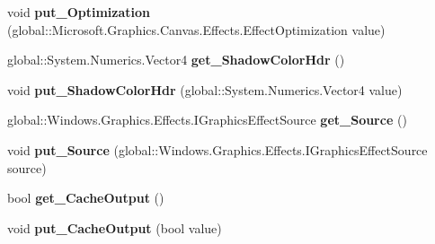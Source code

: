 \begin{DoxyCompactItemize}
void {\bfseries put\+\_\+\+Optimization} (global\+::\+Microsoft.\+Graphics.\+Canvas.\+Effects.\+Effect\+Optimization value)
\item 
\mbox{\label{class_microsoft_1_1_graphics_1_1_canvas_1_1_effects_1_1_shadow_effect_af69aa0225a7b96c1ff39ea116af417b7}} 
global\+::\+System.\+Numerics.\+Vector4 {\bfseries get\+\_\+\+Shadow\+Color\+Hdr} ()
\item 
\mbox{\label{class_microsoft_1_1_graphics_1_1_canvas_1_1_effects_1_1_shadow_effect_a6cbf0da6741b9951835c9e913616a2bc}} 
void {\bfseries put\+\_\+\+Shadow\+Color\+Hdr} (global\+::\+System.\+Numerics.\+Vector4 value)
\item 
\mbox{\label{class_microsoft_1_1_graphics_1_1_canvas_1_1_effects_1_1_shadow_effect_adb562a703cac7d7a98d0a4a852aabc7e}} 
global\+::\+Windows.\+Graphics.\+Effects.\+I\+Graphics\+Effect\+Source {\bfseries get\+\_\+\+Source} ()
\item 
\mbox{\label{class_microsoft_1_1_graphics_1_1_canvas_1_1_effects_1_1_shadow_effect_aa24f56aac89433bb8ba29589ad881cf7}} 
void {\bfseries put\+\_\+\+Source} (global\+::\+Windows.\+Graphics.\+Effects.\+I\+Graphics\+Effect\+Source source)
\item 
\mbox{\label{class_microsoft_1_1_graphics_1_1_canvas_1_1_effects_1_1_shadow_effect_af987e23bb73df6b1f9c785283d094d0d}} 
bool {\bfseries get\+\_\+\+Cache\+Output} ()
\item 
\mbox{\label{class_microsoft_1_1_graphics_1_1_canvas_1_1_effects_1_1_shadow_effect_a9b3935db5f5874ff3345a576b3ea5f09}} 
void {\bfseries put\+\_\+\+Cache\+Output} (bool value)
\item 
\mbox{\label{class_microsoft_1_1_graphics_1_1_canvas_1_1_effects_1_1_shadow_effect_a745238faa1ac3dfdd305932c1efb383b}} 

\end{DoxyCompactItemize}
